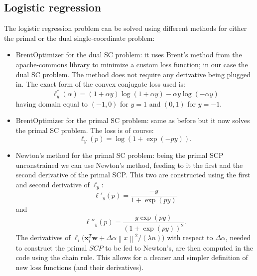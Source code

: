 \documentclass[11pt, a4paper, reqno, twoside]{scrartcl}
\theoremstyle{style}
\providecommand{\norm}[1]{\left\lVert#1\right\rVert}
\newcommand{\x}{\bm{x}}
\newcommand{\wv}{\bm{w}}
\newcommand{\0}{\mathbf{0}} %
\begin{document}
\subsection{Logistic regression}
The logistic regression problem can be solved using different methods for either the primal or the dual single-coordinate problem:
\begin{itemize}
\item BrentOptimizer for the dual SC problem: it uses Brent's method from the apache-commons library to minimize a custom loss function; in our case the dual SC problem. The method does not require any derivative being plugged in. The exact form of the convex conjugate loss used is:
$$
\ell^*_y(\alpha) = (1+\alpha y)\log{(1+\alpha y)} - \alpha y \log{(-\alpha y)}
$$	
having domain equal to $(-1,0)$ for $y = 1$ and $(0,1)$ for $y = -1$.

\item BrentOptimizer for the primal SC problem: same as before but it now solves the primal SC problem. The loss is of course:
$$
\ell_y(p) = \log{(1+\exp{(-py)})}.
$$

\item Newton's method for the primal SC problem: being the primal SCP unconstrained we can use Newton's method, feeding to it the first and the second derivative of the primal SCP. This two are constructed using the first and second derivative of $\ell_y$:
$$
\ell'_y(p) = \frac{-y}{1+\exp{(py)}}
$$
and
$$
\ell''_y(p) = \frac{y \exp(py)}{(1+\exp{(py)})^2}.
$$
The derivatives of $\ell_i\Big(\x_i^T \wv + \Delta\alpha \norm{x}^2/(\lambda n) \Big)$ with respect to $\Delta\alpha$, needed to construct the primal $SCP$ to be fed to Newton's, are then computed in the code using the chain rule. This allows for a cleaner and simpler definition of new loss functions (and their derivatives).



\end{itemize}




\end{document}
